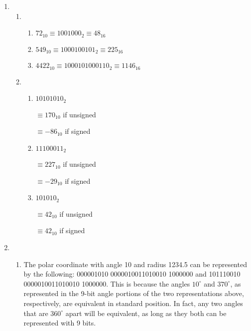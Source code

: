 \documentclass[11pt, notitlepage, leqno]{article}
\begin{document}

\begin{enumerate}

\item \begin{enumerate}

\item \begin{enumerate}

\item $72_{10} \equiv 1001000_2 \equiv 48_{16}$

\item $549_{10} \equiv 1000100101_2 \equiv 225_{16}$

\item $4422_{10} \equiv 1000101000110_2 \equiv 1146_{16}$

\end{enumerate}

\item \begin{enumerate}

\item $10101010_2$

$\equiv 170_{10}$ if unsigned

$\equiv -86_{10}$ if signed

\item $11100011_2$

$\equiv 227_{10}$ if unsigned

$\equiv -29_{10}$ if signed 

\item $101010_2$

$\equiv 42_{10}$ if unsigned

$\equiv 42_{10}$ if signed 

\end{enumerate}

\end{enumerate}

\item \begin{enumerate}

\item The polar coordinate with angle 10 and radius 1234.5 can be represented by the following: 000001010 0000010011010010 1000000 and 101110010 0000010011010010 1000000. This is because the angles $10^\circ$ and $370^\circ$, as represented in the 9-bit angle portions of the two representations above, respectively, are equivalent in standard position. In fact, any two angles that are $360^\circ$ apart will be equivalent, as long as they both can be represented with 9 bits.


\end{enumerate}
\end{enumerate}
\end{document}
